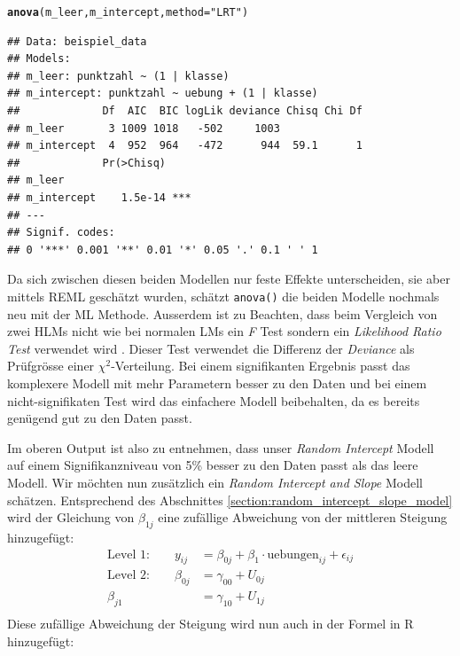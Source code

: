\documentclass[12pt]{article}\usepackage[]{graphicx}\usepackage[]{color}
\makeatletter
\newcommand{\hlstr}[1]{\textcolor[rgb]{0.192,0.494,0.8}{#1}}%
\newcommand{\hlstd}[1]{\textcolor[rgb]{0.345,0.345,0.345}{#1}}%
\newcommand{\hlkwc}[1]{\textcolor[rgb]{0.333,0.667,0.333}{#1}}%
\newcommand{\hlkwd}[1]{\textcolor[rgb]{0.737,0.353,0.396}{\textbf{#1}}}%
\newenvironment{kframe}{%
 \def\at@end@of@kframe{}%
 \ifinner\ifhmode%
  \def\at@end@of@kframe{\end{minipage}}%
  \begin{minipage}{\columnwidth}%
 \fi\fi%
 \def\FrameCommand##1{\hskip\@totalleftmargin \hskip-\fboxsep
 \colorbox{shadecolor}{##1}\hskip-\fboxsep
     \hskip-\linewidth \hskip-\@totalleftmargin \hskip\columnwidth}%
 \MakeFramed {\advance\hsize-\width
   \@totalleftmargin\z@ \linewidth\hsize
   \@setminipage}}%
 {\par\unskip\endMakeFramed%
 \at@end@of@kframe}
\newenvironment{knitrout}{}{} %
\makeatother
\begin{document}
\singlespacing
\begin{knitrout}
\color{fgcolor}\begin{kframe}
\begin{alltt}
\hlkwd{anova}\hlstd{(m_leer, m_intercept,} \hlkwc{method} \hlstd{=} \hlstr{"LRT"}\hlstd{)}
\end{alltt}


{\ttfamily\noindent\itshape\color{messagecolor}{\#\# refitting model(s) with ML (instead of REML)}}\begin{verbatim}
## Data: beispiel_data
## Models:
## m_leer: punktzahl ~ (1 | klasse)
## m_intercept: punktzahl ~ uebung + (1 | klasse)
##             Df  AIC  BIC logLik deviance Chisq Chi Df
## m_leer       3 1009 1018   -502     1003             
## m_intercept  4  952  964   -472      944  59.1      1
##             Pr(>Chisq)    
## m_leer                    
## m_intercept    1.5e-14 ***
## ---
## Signif. codes:  
## 0 '***' 0.001 '**' 0.01 '*' 0.05 '.' 0.1 ' ' 1
\end{verbatim}
\end{kframe}
\end{knitrout}

Da sich zwischen diesen beiden Modellen nur feste Effekte unterscheiden, sie aber mittels REML geschätzt wurden, schätzt \texttt{anova()} die beiden Modelle nochmals neu mit der ML Methode. Ausserdem ist zu Beachten, dass beim Vergleich von zwei HLMs nicht wie bei normalen LMs ein \textit{F} Test sondern ein \textit{Likelihood Ratio Test} verwendet wird \citep{PEUGH201085,SnijdersTomA.B2012Ma:a}. Dieser Test verwendet die Differenz der \textit{Deviance} als Prüfgrösse einer $\chi^2$-Verteilung. Bei einem signifikanten Ergebnis passt das komplexere Modell mit mehr Parametern besser zu den Daten und bei einem nicht-signifikaten Test wird das einfachere Modell beibehalten, da es bereits genügend gut zu den Daten passt.

Im oberen Output ist also zu entnehmen, dass unser \textit{Random Intercept} Modell auf einem Signifikanzniveau von 5\% besser zu den Daten passt als das leere Modell. Wir möchten nun zusätzlich ein \textit{Random Intercept and Slope} Modell schätzen. Entsprechend des Abschnittes \ref{section:random_intercept_slope_model} wird der Gleichung von $\beta_{1j}$ eine zufällige Abweichung von der mittleren Steigung hinzugefügt: 
\begin{equation} 
\begin{split}	
 \text{Level 1:}  \qquad y_{ij} & = \beta_{0j} + \beta_{1} \cdot \text{uebungen}_{ij} + \epsilon_{ij}\\
 \text{Level 2:} \qquad \beta_{0j} & = \gamma_{00} + U_{0j}\\
 \beta_{j1} & = \gamma_{10 }+ U_{1j}\\
\end{split}	
\end{equation} 
Diese zufällige Abweichung der Steigung wird nun auch in der Formel in R hinzugefügt:
\end{document}
